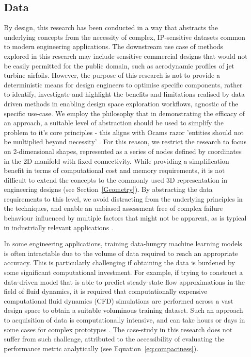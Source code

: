 \documentclass{article}
\begin{document}
\subsection{Data}
By design, this research has been conducted in a way that abstracts the underlying concepts from the necessity of complex, IP-sensitive datasets common to modern engineering applications. The downstream use case of methods explored in this research may include sensitive commercial designs that would not be easily permitted for the public domain, such as aerodynamic profiles of jet turbine airfoils. However, the purpose of this research is not to provide a deterministic means for design engineers to optimise specific components, rather to identify, investigate and highlight the benefits and limitations realised by data driven methods in enabling design space exploration workflows, agnostic of the specific use-case. We employ the philosophy that in demonstrating the efficacy of an approach, a suitable level of abstraction should be used to simplify the problem to it's core principles - this aligns with Ocams razor 'entities should not be multiplied beyond necessity' \citep{Gori2024}. For this reason, we restrict the research to focus on 2-dimensional shapes, represented as a series of nodes defined by coordinates in the 2D manifold with fixed connectivity. While providing a simplification benefit in terms of computational cost and memory requirements, it is not difficult to extend the concepts to the commonly used 3D representation in engineering designs (see Section~\ref{Geometry}). By abstracting the data requirements to this level, we avoid distracting from the underlying principles in the techniques, and enable an unbiased assessment free of complex failure behaviour influenced by
multiple factors that might not be apparent, as is typical in industrially relevant applications \citep{Hobbs2021}.

In some engineering applications, training data-hungry machine learning models is often intractable due to the volume of data required to reach an appropriate accuracy. This is particularly challenging if obtaining the data is burdened by some significant computational investment. For example, if trying to construct a data-driven model that is able to predict steady-state flow approximations in the field of fluid dynamics, it is required that computationally expensive computational fluid dynamics (CFD) simulations are performed across a vast design space to obtain a suitable voluminous training dataset. Such an approach to acquisition of data is computationally intensive, and can take hours or days in some cases for complex prototypes \citep{guo2016convolutional}. The case-study in this research does not suffer from such challenge, attributed to the accessibility of evaluating the performance metric analytically (see Equation~\ref{eq:compactness}).
\end{document}
